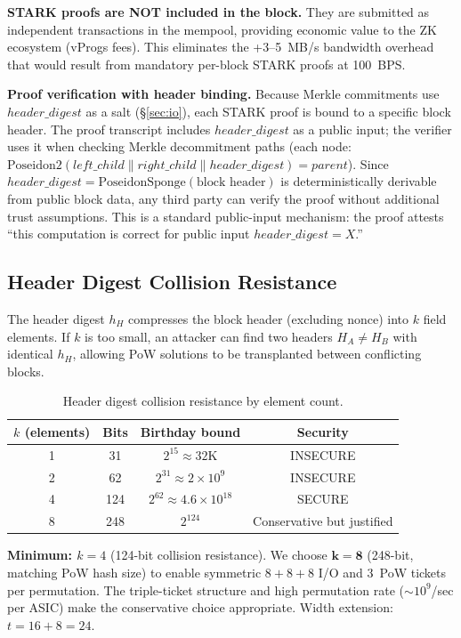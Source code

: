 \documentclass[11pt,a4paper]{article}
\begin{document}
\textbf{STARK proofs are NOT included in the block.} They are submitted as independent transactions in the mempool, providing economic value to the ZK ecosystem (vProgs fees). This eliminates the +3--5~MB/s bandwidth overhead that would result from mandatory per-block STARK proofs at 100~BPS.

\textbf{Proof verification with header binding.} Because Merkle commitments use $\mathit{header\_digest}$ as a salt (\S\ref{sec:io}), each STARK proof is bound to a specific block header. The proof transcript includes $\mathit{header\_digest}$ as a public input; the verifier uses it when checking Merkle decommitment paths (each node: $\text{Poseidon2}(\mathit{left\_child} \| \mathit{right\_child} \| \mathit{header\_digest}) = \mathit{parent}$). Since $\mathit{header\_digest} = \text{PoseidonSponge}(\text{block header})$ is deterministically derivable from public block data, any third party can verify the proof without additional trust assumptions. This is a standard public-input mechanism: the proof attests ``this computation is correct for public input $\mathit{header\_digest} = X$.''

\subsection{Header Digest Collision Resistance}

The header digest $h_H$ compresses the block header (excluding nonce) into $k$ field elements. If $k$ is too small, an attacker can find two headers $H_A \neq H_B$ with identical $h_H$, allowing PoW solutions to be transplanted between conflicting blocks.

\begin{table}[h]
\centering
\begin{tabular}{@{}cccc@{}}
\toprule
$k$ (elements) & Bits & Birthday bound & Security \\
\midrule
1 & 31 & $2^{15} \approx 32$K & INSECURE \\
2 & 62 & $2^{31} \approx 2 \times 10^9$ & INSECURE \\
4 & 124 & $2^{62} \approx 4.6 \times 10^{18}$ & SECURE \\
8 & 248 & $2^{124}$ & Conservative but justified \\
\bottomrule
\end{tabular}
\caption{Header digest collision resistance by element count.}
\label{tab:collision}
\end{table}

\textbf{Minimum: $k = 4$} (124-bit collision resistance). We choose $\mathbf{k = 8}$ (248-bit, matching PoW hash size) to enable symmetric $8{+}8{+}8$ I/O and 3~PoW tickets per permutation. The triple-ticket structure and high permutation rate (${\sim}10^9$/sec per ASIC) make the conservative choice appropriate. Width extension: $t = 16 + 8 = 24$.
\end{document}
